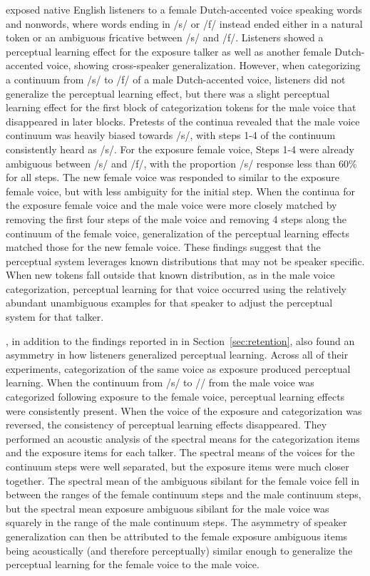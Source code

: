 \citet{Reinisch2013a} exposed native English listeners to a female Dutch-accented voice speaking words and nonwords, where words ending in /s/ or /f/ instead ended either in a natural token or an ambiguous fricative between /s/ and /f/.  
Listeners showed a perceptual learning effect for the exposure talker as well as another female Dutch-accented voice, showing cross-speaker generalization.  
However, when categorizing a continuum from /s/ to /f/ of a male Dutch-accented voice, listeners did not generalize the perceptual learning effect, but there was a slight perceptual learning effect for the first block of categorization tokens for the male voice that disappeared in later blocks.  
Pretests of the continua revealed that the male voice continuum was heavily biased towards /s/, with steps 1-4 of the continuum consistently heard as /s/. 
For the exposure female voice, Steps 1-4 were already ambiguous between /s/ and /f/, with the proportion /s/ response less than 60\% for all steps.  
The new female voice was responded to similar to the exposure female voice, but with less ambiguity for the initial step.  
When the continua for the exposure female voice and the male voice were more closely matched by removing the first four steps of the male voice and removing 4 steps along the continuum of the female voice, generalization of the perceptual learning effects matched those for the new female voice.  
These findings suggest that the perceptual system leverages known distributions that may not be speaker specific.  
When new tokens fall outside that known distribution, as in the male voice categorization, perceptual learning for that voice occurred using the relatively abundant unambiguous examples for that speaker to adjust the perceptual system for that talker.

\citet{Kraljic2005}, in addition to the findings reported in in Section~\ref{sec:retention}, also found an asymmetry in how listeners generalized perceptual learning.  
Across all of their experiments, categorization of the same voice as exposure produced perceptual learning.  
When the continuum from /s/ to /\textesh/ from the male voice was categorized following exposure to the female voice, perceptual learning effects were consistently present.
When the voice of the exposure and categorization was reversed, the consistency of perceptual learning effects disappeared. 
They performed an acoustic analysis of the spectral means for the categorization items and the exposure items for each talker.  
The spectral means of the voices for the continuum steps were well separated, but the exposure items were much closer together.  
The spectral mean of the ambiguous sibilant for the female voice fell in between the ranges of the female continuum steps and the male continuum steps, but the spectral mean exposure ambiguous sibilant for the male voice was squarely in the range of the male continuum steps.  
The asymmetry of speaker generalization can then be attributed to the female exposure ambiguous items being acoustically (and therefore perceptually) similar enough to generalize the perceptual learning for the female voice to the male voice.

